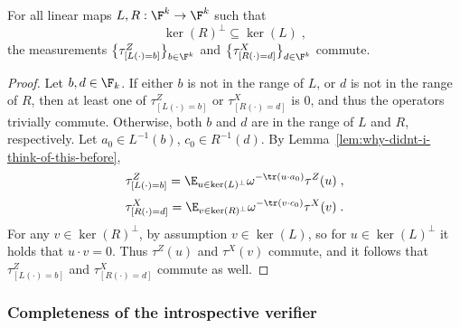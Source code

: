 \begin{lemma}
  \label{lem:commute} 
	For all linear maps $L,R: \F^k \to \F^k$ such that
  \begin{equation*}
    \ker (R)^\perp \subseteq \ker (L)\;,
  \end{equation*}
  the measurements
  $\big\{ \tau^Z_{[L(\cdot)=b]} \big\}_{b\in \F^k}$ and $\big\{ \tau^X_{[R(\cdot) = d]}
  \big\}_{d\in \F^k}$ commute.
\end{lemma}
\begin{proof}
  Let $b,d\in \F_k$.
  If either $b$ is not in the range of $L$, or $d$ is not in the range of $R$,
  then at least one of $\tau^Z_{[L(\cdot) = b]}$ or $\tau^X_{[R(\cdot) = d]}$ is
  $0$, and thus the operators trivially commute.
  Otherwise, both $b$ and $d$ are in the range of $L$ and $R$, respectively.
  Let $a_0 \in L^{-1}(b)$, $c_0 \in R^{-1}(d)$.
  By Lemma~\ref{lem:why-didnt-i-think-of-this-before},
  \begin{equation*}
    \tau^Z_{[L(\cdot)=b]} = \E_{u \in \ker(L)^\perp}
    \omega^{-\tr(u \cdot a_0)} \tau^Z(u)\;,
  \end{equation*}
  \begin{equation*}
    \tau^X_{[R(\cdot)=d]} = \E_{v \in \ker(R)^\perp}
    \omega^{-\tr(v \cdot c_0)} \tau^X(v)\;.
  \end{equation*}
  For any $v \in \ker(R)^\perp$, by assumption $v\in \ker(L)$, so for $u \in
  \ker(L)^\perp$ it holds that $u\cdot v=0$.
  Thus $\tau^Z(u)$ and $\tau^X(v)$ commute, and it follows that
  $\tau^Z_{[L(\cdot)=b]}$ and $\tau^X_{[R(\cdot)=d]}$ commute as well.
\end{proof}

\subsubsection{Completeness of the introspective verifier}
\label{sec:intro-completeness-sub}













